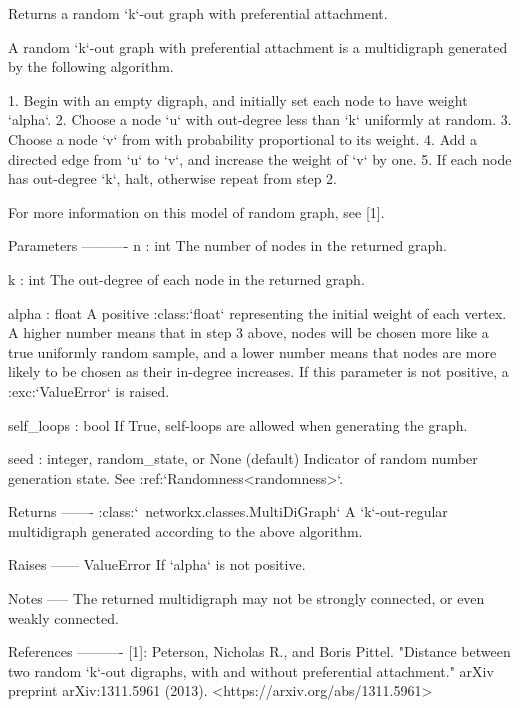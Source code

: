 \begin{DoxyVerb}Returns a random `k`-out graph with preferential attachment.

A random `k`-out graph with preferential attachment is a
multidigraph generated by the following algorithm.

1. Begin with an empty digraph, and initially set each node to have
   weight `alpha`.
2. Choose a node `u` with out-degree less than `k` uniformly at
   random.
3. Choose a node `v` from with probability proportional to its
   weight.
4. Add a directed edge from `u` to `v`, and increase the weight
   of `v` by one.
5. If each node has out-degree `k`, halt, otherwise repeat from
   step 2.

For more information on this model of random graph, see [1].

Parameters
----------
n : int
    The number of nodes in the returned graph.

k : int
    The out-degree of each node in the returned graph.

alpha : float
    A positive :class:`float` representing the initial weight of
    each vertex. A higher number means that in step 3 above, nodes
    will be chosen more like a true uniformly random sample, and a
    lower number means that nodes are more likely to be chosen as
    their in-degree increases. If this parameter is not positive, a
    :exc:`ValueError` is raised.

self_loops : bool
    If True, self-loops are allowed when generating the graph.

seed : integer, random_state, or None (default)
    Indicator of random number generation state.
    See :ref:`Randomness<randomness>`.

Returns
-------
:class:`~networkx.classes.MultiDiGraph`
    A `k`-out-regular multidigraph generated according to the above
    algorithm.

Raises
------
ValueError
    If `alpha` is not positive.

Notes
-----
The returned multidigraph may not be strongly connected, or even
weakly connected.

References
----------
[1]: Peterson, Nicholas R., and Boris Pittel.
     "Distance between two random `k`-out digraphs, with and without
     preferential attachment."
     arXiv preprint arXiv:1311.5961 (2013).
     <https://arxiv.org/abs/1311.5961>\end{DoxyVerb}
 \mbox{\label{namespacenetworkx_1_1generators_1_1directed_a8bf4b279d4cc1f9839eb28fac2608429}} 
